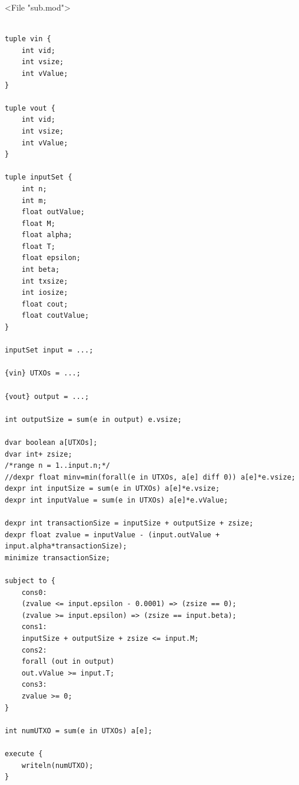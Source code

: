 \documentclass[a4paper]{article}
\begin{document}
<File "sub.mod">
\begin{lstlisting}[frame=single]

tuple vin {
	int vid;
	int vsize;
	int vValue; 
}

tuple vout {
	int vid;
	int vsize;
	int vValue; 
}

tuple inputSet {
	int n;
	int m;
	float outValue;
	float M;
	float alpha;
	float T;
	float epsilon;
	int beta;
	int txsize;
	int iosize;
	float cout;
	float coutValue;
}

inputSet input = ...;

{vin} UTXOs = ...;

{vout} output = ...;

int outputSize = sum(e in output) e.vsize;

dvar boolean a[UTXOs];
dvar int+ zsize;
/*range n = 1..input.n;*/
//dexpr float minv=min(forall(e in UTXOs, a[e] diff 0)) a[e]*e.vsize;
dexpr int inputSize = sum(e in UTXOs) a[e]*e.vsize;
dexpr int inputValue = sum(e in UTXOs) a[e]*e.vValue;

dexpr int transactionSize = inputSize + outputSize + zsize;
dexpr float zvalue = inputValue - (input.outValue + input.alpha*transactionSize);
minimize transactionSize;

subject to {
	cons0:
	(zvalue <= input.epsilon - 0.0001) => (zsize == 0);
	(zvalue >= input.epsilon) => (zsize == input.beta);
	cons1:
	inputSize + outputSize + zsize <= input.M;
	cons2: 
	forall (out in output)
	out.vValue >= input.T;
	cons3:
	zvalue >= 0;
}

int numUTXO = sum(e in UTXOs) a[e];

execute {
	writeln(numUTXO);
}

\end{lstlisting}
\end{document}
